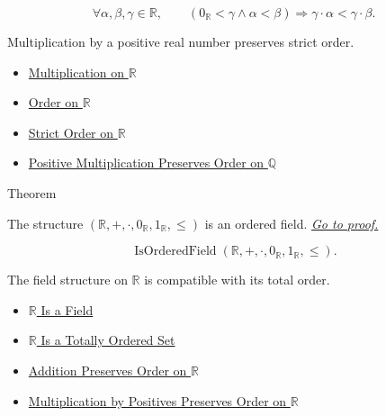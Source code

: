 \begin{remark*}
\[
\forall \alpha,\beta,\gamma\in\mathbb{R},\qquad
(0_{\mathbb{R}}<\gamma\land\alpha<\beta)
\Longrightarrow
\gamma\cdot\alpha<\gamma\cdot\beta.
\]
\end{remark*}

\begin{remark*}[Interpretation]
Multiplication by a positive real number preserves strict order.
\end{remark*}

\begin{dependencies}
\begin{itemize}
  \item \hyperref[def:multiplication-on-r]{Multiplication on $\mathbb{R}$}
  \item \hyperref[def:order-on-r]{Order on $\mathbb{R}$}
  \item \hyperref[def:strict-order-on-r]{Strict Order on $\mathbb{R}$}
  \item \hyperref[thm:positive-multiplication-preserves-order-on-q]{Positive Multiplication Preserves Order on $\mathbb{Q}$}
\end{itemize}
\end{dependencies}

\begin{theorembox}{Theorem}
\begin{theorem}
\label{thm:r-is-an-ordered-field}
The structure $(\mathbb{R},+,\cdot,0_{\mathbb{R}},1_{\mathbb{R}},\le)$ is an
ordered field.
\hyperref[prf:r-is-an-ordered-field]{\textit{Go to proof.}}
\end{theorem}
\end{theorembox}

\begin{remark*}
\[
\operatorname{IsOrderedField}(\mathbb{R},+,\cdot,0_{\mathbb{R}},1_{\mathbb{R}},\le).
\]
\end{remark*}

\begin{remark*}[Interpretation]
The field structure on $\mathbb{R}$ is compatible with its total order.
\end{remark*}

\begin{dependencies}
\begin{itemize}
  \item \hyperref[thm:r-is-a-field]{$\mathbb{R}$ Is a Field}
  \item \hyperref[thm:r-totally-ordered-set]{$\mathbb{R}$ Is a Totally Ordered Set}
  \item \hyperref[thm:addition-preserves-order-on-r]{Addition Preserves Order on $\mathbb{R}$}
  \item \hyperref[thm:positive-multiplication-preserves-order-on-r]{Multiplication by Positives Preserves Order on $\mathbb{R}$}
\end{itemize}
\end{dependencies}

